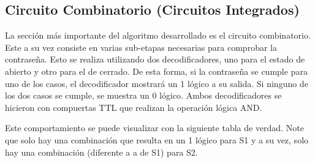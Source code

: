 \documentclass[conference]{IEEEtran}  %
\begin{document}
\subsection{Circuito Combinatorio (Circuitos Integrados)}

La sección más importante del algoritmo desarrollado es el circuito combinatorio. Este a su vez consiste en varias sub-etapas necesarias para comprobar la contraseña. Esto se realiza utilizando dos decodificadores, uno para el estado de abierto y otro para el de cerrado. De esta forma, si la contraseña se cumple para uno de los casos, el decodificador mostrará un 1 lógico a su salida. Si ninguno de los dos casos se cumple, se muestra un 0 lógico. Ambos decodificadores se hicieron con compuertas TTL que realizan la operación lógica AND. 

Este comportamiento se puede visualizar con la siguiente tabla de verdad. Note que solo hay una combinación que resulta en un 1 lógico para S1 y a su vez, solo hay una combinación (diferente a a de S1) para S2.

\begin{table}[h!]
\centering
{}
\caption{Tabla de Verdad para decodificador de 8 bits a 2 salidas de 1 bit}
\label{tab:8in2out}
\end{table}
\end{document}
